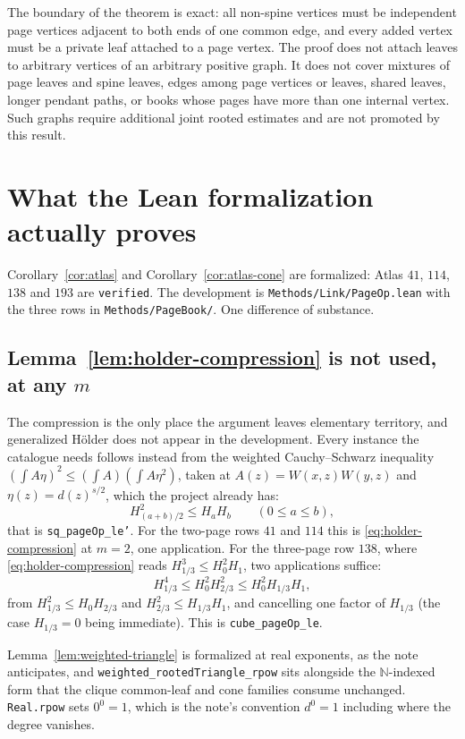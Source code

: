 \documentclass[11pt]{article}
\begin{document}
The boundary of the theorem is exact: all non-spine vertices must be
independent page vertices adjacent to both ends of one common edge,
and every added vertex must be a private leaf attached to a page
vertex.  The proof does not attach leaves to arbitrary vertices of an
arbitrary positive graph.  It does not cover mixtures of page leaves
and spine leaves, edges among page vertices or leaves, shared leaves,
longer pendant paths, or books whose pages have more than one internal
vertex.  Such graphs require additional joint rooted estimates and are
not promoted by this result.

\appendix
\section{What the Lean formalization actually proves}

Corollary~\ref{cor:atlas} and Corollary~\ref{cor:atlas-cone} are formalized:
Atlas $41$, $114$, $138$ and $193$ are \texttt{verified}.  The development is
\texttt{Methods/Link/PageOp.lean} with the three rows in
\texttt{Methods/PageBook/}.  One difference of substance.

\subsection*{Lemma~\ref{lem:holder-compression} is not used, at any $m$}

The compression is the only place the argument leaves elementary territory,
and generalized H\"older does not appear in the development.  Every instance
the catalogue needs follows instead from the weighted Cauchy--Schwarz
inequality $(\int A\eta)^2\leq(\int A)(\int A\eta^2)$, taken at
$A(z)=W(x,z)W(y,z)$ and $\eta(z)=d(z)^{s/2}$, which the project already has:
\[
 H_{(a+b)/2}^2\leq H_aH_b\qquad(0\leq a\leq b),
\]
that is \texttt{sq\_pageOp\_le'}.  For the two-page rows $41$ and $114$ this is
\eqref{eq:holder-compression} at $m=2$, one application.  For the three-page
row $138$, where \eqref{eq:holder-compression} reads $H_{1/3}^3\leq H_0^2H_1$,
two applications suffice:
\[
 H_{1/3}^4\leq H_0^2H_{2/3}^2\leq H_0^2H_{1/3}H_1 ,
\]
from $H_{1/3}^2\leq H_0H_{2/3}$ and $H_{2/3}^2\leq H_{1/3}H_1$, and cancelling
one factor of $H_{1/3}$ (the case $H_{1/3}=0$ being immediate).  This is
\texttt{cube\_pageOp\_le}.

Lemma~\ref{lem:weighted-triangle} is formalized at real exponents, as the note
anticipates, and \texttt{weighted\_rootedTriangle\_rpow} sits alongside the
$\mathbb N$-indexed form that the clique common-leaf and cone families consume
unchanged.  \texttt{Real.rpow} sets $0^0=1$, which is the note's convention
$d^0=1$ including where the degree vanishes.
\end{document}
